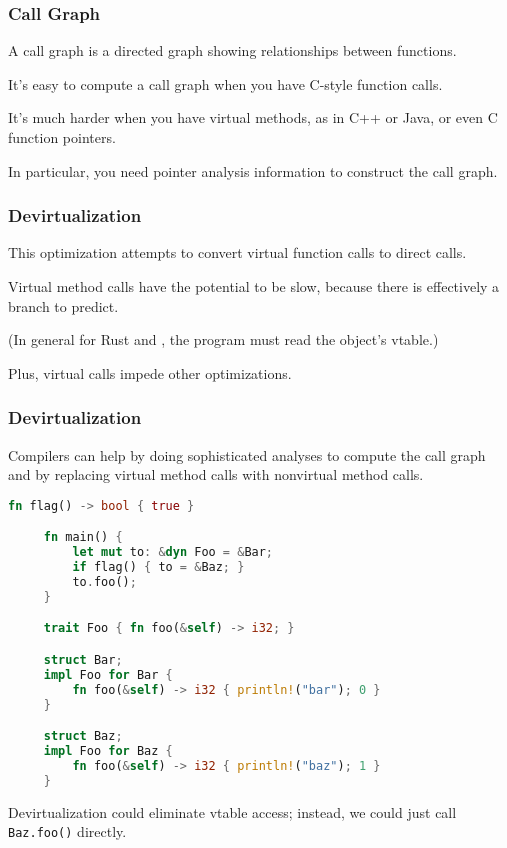 \begin{frame}
\frametitle{Call Graph}


A \alert{call graph} is a directed graph showing relationships between
functions. 

It's easy to compute a call graph when you have C-style
function calls. 

It's much harder when you have virtual methods, as in
C++ or Java, or even C function pointers. 

In particular, you need pointer
analysis information to construct the call graph.


\end{frame}


\begin{frame}
\frametitle{Devirtualization}

This optimization attempts to convert virtual function calls to direct calls.  

Virtual method calls have the potential to be slow, because there is effectively a branch to predict. 

(In general for Rust and \CPP, the program must read the object's vtable.) 

Plus, virtual calls impede other optimizations.

\end{frame}

\begin{frame}[fragile]
\frametitle{Devirtualization}

Compilers can help by doing sophisticated analyses to compute the call graph and by replacing virtual method calls with nonvirtual method calls.  


 \begin{lstlisting}[language=Rust]
     fn flag() -> bool { true }

     fn main() {
         let mut to: &dyn Foo = &Bar;
         if flag() { to = &Baz; }
         to.foo();
     }

     trait Foo { fn foo(&self) -> i32; }

     struct Bar;
     impl Foo for Bar {
         fn foo(&self) -> i32 { println!("bar"); 0 }
     }

     struct Baz;
     impl Foo for Baz {
         fn foo(&self) -> i32 { println!("baz"); 1 }
     }
  \end{lstlisting}

Devirtualization could eliminate vtable access; instead, we could just call {\tt Baz.foo()} 
directly. 

\end{frame}

